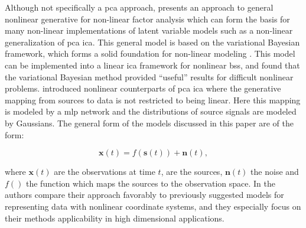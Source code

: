 Although not specifically a \DIFdelbegin {}\DIFdelend \DIFaddbegin \gls{pca} \DIFaddend approach, \cite{Honkela2005} presents an approach to general nonlinear generative \DIFdelbegin {}\DIFdelend \DIFaddbegin {}\DIFaddend for non-linear factor analysis which can form the basis for many non-linear implementations of latent variable models such as a non-linear generalization of \DIFdelbegin {}\DIFdelend \DIFaddbegin \gls{pca} \gls{ica}\DIFaddend . This general model is based on the variational Bayesian framework, which forms a solid foundation for non-linear modeling \citep{Honkela2005}. This model can be implemented into a linear \DIFdelbegin {}\DIFdelend \DIFaddbegin \gls{ica} \DIFaddend framework for nonlinear \DIFdelbegin {}\DIFdelend \DIFaddbegin \gls{bss}\DIFaddend , and \cite{Valpola2003} found that the variational Bayesian method provided ``useful'' results for difficult nonlinear problems. \citep{Lappalainen2000} introduced nonlinear counterparts of \DIFdelbegin {}\DIFdelend \DIFaddbegin \gls{pca} \gls{ica} \DIFaddend where the generative mapping from sources to data is not restricted to being linear. Here this mapping is modeled by a \DIFdelbegin {}\DIFdelend \DIFaddbegin \gls{mlp} \DIFaddend network and the distributions of source signals are modeled by Gaussians. The general form of the models discussed in this paper are of the form:

\begin{equation}\label{eq:nonlinear}
\textbf{x}(t) = f\left(\textbf{s}(t)\right) + \textbf{n}\left(t\right),
\end{equation}

where $\textbf{x}(t)$ are the observations at time $t$, \DIFdelbegin {}\DIFdelend \DIFaddbegin {}\DIFaddend are the sources, $\textbf{n}(t)$ the noise and $f()$ the function which maps the sources to the observation space. In \cite{Lappalainen2000} the authors compare their approach favorably to previously suggested models for representing data with nonlinear coordinate systems, and they especially focus on their methods applicability in high dimensional applications.

